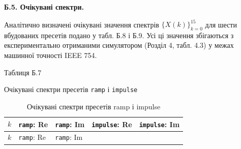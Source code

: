 \documentclass[
]{article}
\newcommand{\passthrough}[1]{#1}
\begin{document}
\textbf{Б.5. Очікувані спектри.}

Аналітично визначені очікувані значення спектрів
\(\{ X(k)\}_{k = 0}^{15}\) для шести вбудованих пресетів подано у табл.
Б.8 і Б.9. Усі ці значення збігаються з експериментально отриманими
симулятором (Розділ 4, табл. 4.3) у межах машинної точності IEEE 754.

Таблиця Б.7

Очікувані спектри пресетів \passthrough{\lstinline!ramp!} і
\passthrough{\lstinline!impulse!}

\begin{longtable}[]{@{}
  >{\raggedright\arraybackslash}p{}
  >{\raggedright\arraybackslash}p{}
  >{\raggedright\arraybackslash}p{}
  >{\raggedright\arraybackslash}p{}
  >{\raggedright\arraybackslash}p{}@{}}
\caption[Очікувані спектри пресетів ramp і impulse]{Очікувані спектри
пресетів ramp і impulse}\tabularnewline
\toprule\noalign{}
\begin{minipage}[b]{\linewidth}\raggedright
\[k\]
\end{minipage} & \begin{minipage}[b]{\linewidth}\raggedright
\passthrough{\lstinline!ramp!}: Re
\end{minipage} & \begin{minipage}[b]{\linewidth}\raggedright
\passthrough{\lstinline!ramp!}: Im
\end{minipage} & \begin{minipage}[b]{\linewidth}\raggedright
\passthrough{\lstinline!impulse!}: Re
\end{minipage} & \begin{minipage}[b]{\linewidth}\raggedright
\passthrough{\lstinline!impulse!}: Im
\end{minipage} \\
\midrule\noalign{}
\endfirsthead
\toprule\noalign{}
\begin{minipage}[b]{\linewidth}\raggedright
\[k\]
\end{minipage} & \begin{minipage}[b]{\linewidth}\raggedright
\passthrough{\lstinline!ramp!}: Re
\end{minipage} & \begin{minipage}[b]{\linewidth}\raggedright
\passthrough{\lstinline!ramp!}: Im
\end{minipage} & \begin{minipage}[b]{\linewidth}\raggedright

\end{minipage}
\end{longtable}
\end{document}
